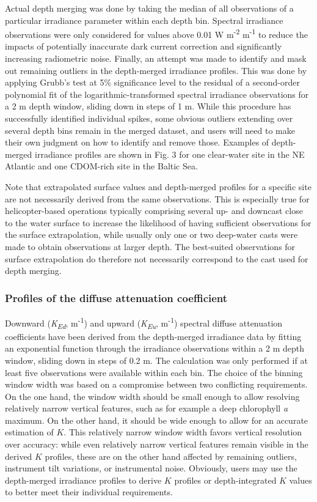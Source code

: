 \documentclass[essd, manuscript]{copernicus}
\begin{document}
Actual depth merging was done by taking the median of all observations of a particular irradiance parameter within each depth bin. Spectral irradiance observations were only considered for values above 0.01 W m\textsuperscript{-2} \textmu m\textsuperscript{-1} to reduce the impacts of potentially inaccurate dark current correction and significantly increasing radiometric noise. Finally, an attempt was made to identify and mask out remaining outliers in the depth-merged irradiance profiles. This was done by applying Grubb's test at 5\% significance level \citep{Guthrie2012} to the residual of a second-order polynomial fit of the logarithmic-transformed spectral irradiance observations for a 2 m depth window, sliding down in steps of 1 m. While this procedure has successfully identified individual spikes, some obvious outliers extending over several depth bins remain in the merged dataset, and users will need to make their own judgment on how to identify and remove those. Examples of depth-merged irradiance profiles are shown in Fig. 3 for one clear-water site in the NE Atlantic and one CDOM-rich site in the Baltic Sea.

Note that extrapolated surface values and depth-merged profiles for a specific site are not necessarily derived from the same observations. This is especially true for helicopter-based operations typically comprising several up- and downcast close to the water surface to increase the likelihood of having sufficient observations for the surface extrapolation, while usually only one or two deep-water casts were made to obtain observations at larger depth. The best-suited observations for surface extrapolation do therefore not necessarily correspond to the cast used for depth merging. 

\subsubsection{Profiles of the diffuse attenuation coefficient}

Downward (\textit{K\textsubscript{Ed}}, m\textsuperscript{-1}) and upward (\textit{K\textsubscript{Eu}}, m\textsuperscript{-1}) spectral diffuse attenuation coefficients have been derived from the depth-merged irradiance data by fitting an exponential function through the irradiance observations within a 2 m depth window, sliding down in steps of 0.2 m. The calculation was only performed if at least five observations were available within each bin. The choice of the binning window width was based on a compromise between two conflicting requirements. On the one hand, the window width should be small enough to allow resolving relatively narrow vertical features, such as for example a deep chlorophyll \textit{a} maximum. On the other hand, it should be wide enough to allow for an accurate estimation of $K$. This relatively narrow window width favors vertical resolution over accuracy: while even relatively narrow vertical features remain visible in the derived $K$ profiles, these are on the other hand affected by remaining outliers, instrument tilt variations, or instrumental noise. Obviously, users may use the depth-merged irradiance profiles to derive $K$ profiles or depth-integrated $K$ values to better meet their individual requirements.
\end{document}

